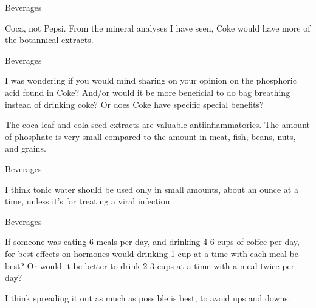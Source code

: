 \documentclass[11pt,oneside,openany,extrafontsizes]{memoir}
\begin{document}
\begin{standalonequote}{Beverages}

    \begin{answer}
        Coca, not Pepsi. From the mineral analyses I have seen, Coke would have more of the botannical extracts.
    \end{answer}
\end{standalonequote}

\begin{qaexchange}{Beverages}

    \begin{question}
        I was wondering if you would mind sharing on your opinion on the phosphoric acid found in Coke?
And/or would it be more beneficial to do bag breathing instead of drinking coke?
Or does Coke have specific special benefits?
    \end{question}

    \begin{answer}
        The coca leaf and cola seed extracts are valuable antiinflammatories.
The amount of phosphate is very small compared to the amount in meat, fish, beans, nuts, and grains.
    \end{answer}
\end{qaexchange}

\begin{standalonequote}{Beverages}

    \begin{answer}
        I think tonic water should be used only in small amounts, about an ounce at a time, unless it's for treating a viral infection.
    \end{answer}
\end{standalonequote}

\begin{qaexchange}{Beverages}

    \begin{question}
        If someone was eating 6 meals per day, and drinking 4-6 cups of coffee per day, for best effects on hormones would drinking 1 cup at a time with each meal be best? Or would it be better to drink 2-3 cups at a time with a meal twice per day?
    \end{question}

    \begin{answer}
        I think spreading it out as much as possible is best, to avoid ups and downs.
    \end{answer}
\end{qaexchange}
\end{document}
